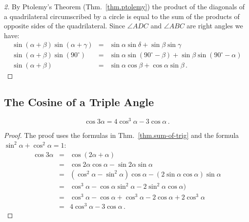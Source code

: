 \begin{proof}[2]
By Ptolemy's Theorem (Thm.~\ref{thm.ptolemy}) the product of the diagonals of a quadrilateral circumscribed by a circle is equal to the sum of the products of opposite sides of the quadrilateral. Since $\angle ADC$ and $\angle ABC$ are right angles we have:
\[
\renewcommand{\arraystretch}{1.3}
\begin{array}{lcl}
\sin (\alpha+\beta)\sin(\alpha+\gamma)&=&
\sin \alpha \sin\delta + \sin \beta\sin \gamma\\
\sin (\alpha+\beta)\sin(90^\circ)&=&
\sin \alpha \sin(90^\circ-\beta) + \sin \beta\sin (90^\circ-\alpha)\\
\sin (\alpha+\beta)&=&\sin\alpha\cos\beta+\cos\alpha\sin \beta\,.
\end{array}
\]
\end{proof}


\subsection{The Cosine of a Triple Angle}\label{s.cosine}
\begin{theorem}\label{thm.triple-angle}
\[
\cos 3\alpha=4\cos^3\alpha -3\cos\alpha\,.
\]
\end{theorem}
\begin{proof}
The proof uses the formulas in Thm.~\ref{thm.sum-of-trig} and the formula $\sin^2\alpha+\cos^2\alpha=1$:
\begin{eqnarray*}
\cos 3\alpha &=& \cos (2\alpha +\alpha)\\
&=& \cos 2\alpha\cos\alpha - \sin 2\alpha\sin\alpha\\
&=& (\cos^2\alpha -\sin^2\alpha)\cos\alpha - (2\sin\alpha\cos\alpha)\sin\alpha\\
&=&\cos^3\alpha - \cos\alpha\sin^2\alpha -2\sin^2\alpha\cos\alpha)\\
&=&\cos^3\alpha - \cos\alpha +\cos^3\alpha -2\cos\alpha+2\cos^3\alpha\\
&=&4\cos^3\alpha -3\cos\alpha\,.
\end{eqnarray*}
\end{proof}


